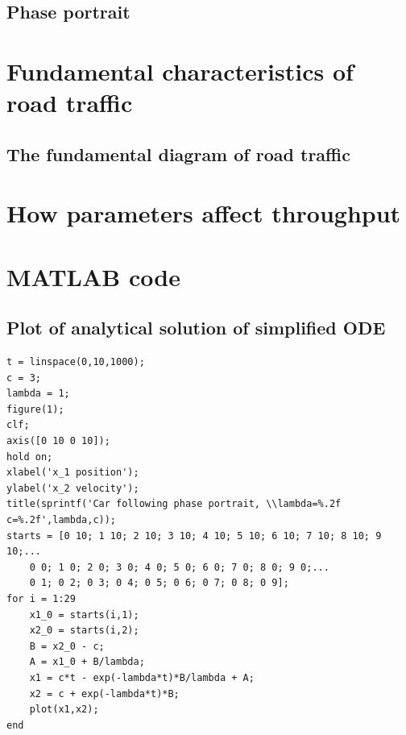 \documentclass[11pt,a4paper]{article}
\begin{document}
\subsection{Phase portrait}

\section{Fundamental characteristics of road traffic}
\subsection{The fundamental diagram of road traffic}


\section{How parameters affect throughput}

\section{MATLAB code}
\subsection{Plot of analytical solution of simplified ODE}
\begin{verbatim}
t = linspace(0,10,1000);
c = 3;
lambda = 1;
figure(1);
clf;
axis([0 10 0 10]);
hold on;
xlabel('x_1 position');
ylabel('x_2 velocity');
title(sprintf('Car following phase portrait, \\lambda=%.2f c=%.2f',lambda,c));
starts = [0 10; 1 10; 2 10; 3 10; 4 10; 5 10; 6 10; 7 10; 8 10; 9 10;...
    0 0; 1 0; 2 0; 3 0; 4 0; 5 0; 6 0; 7 0; 8 0; 9 0;...
    0 1; 0 2; 0 3; 0 4; 0 5; 0 6; 0 7; 0 8; 0 9];
for i = 1:29
    x1_0 = starts(i,1);
    x2_0 = starts(i,2);
    B = x2_0 - c;
    A = x1_0 + B/lambda;
    x1 = c*t - exp(-lambda*t)*B/lambda + A;
    x2 = c + exp(-lambda*t)*B;
    plot(x1,x2);
end

\end{verbatim}
\end{document}
